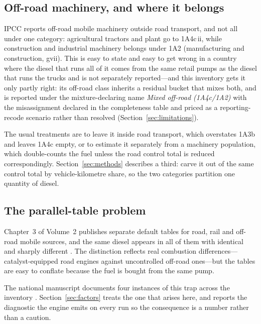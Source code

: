 \subsection{Off-road machinery, and where it belongs}

IPCC reports off-road mobile machinery outside road transport, and not all under one
category: agricultural tractors and plant go to 1A4c\,ii, while construction and industrial
machinery belongs under 1A2 (manufacturing and construction, gvii). This is easy to state
and easy to get wrong in a country where the diesel that runs all of it comes from the same
retail pumps as the diesel that runs the trucks and is not separately reported---and this
inventory gets it only partly right: its off-road class inherits a residual bucket that
mixes both, and is reported under the mixture-declaring name \emph{Mixed off-road
(1A4c/1A2)} with the misassignment declared in the completeness table and priced as a
reporting-recode scenario rather than resolved (Section~\ref{sec:limitations}).

The usual treatments are to leave it inside road transport, which overstates 1A3b and leaves
1A4c empty, or to estimate it separately from a machinery population, which double-counts the
fuel unless the road control total is reduced correspondingly. Section~\ref{sec:methods}
describes a third: carve it out of the same control total by vehicle-kilometre share, so the
two categories partition one quantity of diesel.

\subsection{The parallel-table problem}

Chapter~3 of Volume~2 publishes separate default tables for road, rail and off-road mobile
sources, and the same diesel appears in all of them with identical \COtwo{} and sharply
different \NtwoO{}. The distinction reflects real combustion differences---catalyst-equipped
road engines against uncontrolled off-road ones---but the tables are easy to conflate because
the fuel is bought from the same pump.

The national manuscript documents four instances of this trap across the inventory
\citep{ahmad2026national}. Section~\ref{sec:factors} treats the one that arises here, and
reports the diagnostic the engine emits on every run so the consequence is a number rather
than a caution.
